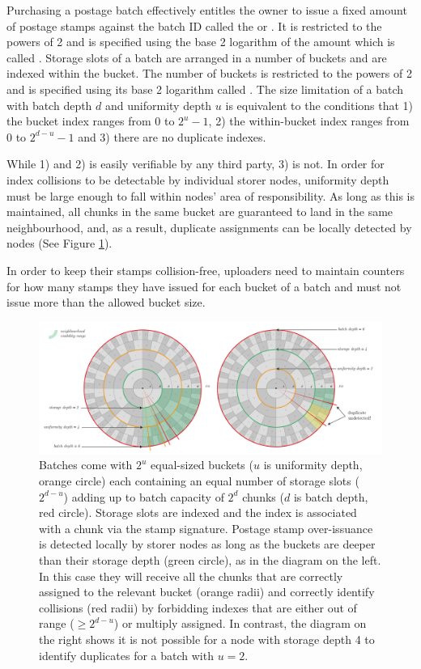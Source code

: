 Purchasing a postage batch effectively entitles the owner to issue a fixed amount of postage stamps against the batch ID called the  or . It is restricted to the powers of 2 and is specified using the base 2 logarithm of the amount which is called . Storage slots of a batch are arranged in a number of buckets and are indexed within the bucket. The number of buckets is restricted to the powers of 2 and is specified using its base 2 logarithm called . The size limitation of a batch with batch depth $d$ and uniformity depth $u$ is equivalent to the conditions that 1) the bucket index ranges from 0 to $2^u-1$, 2) the within-bucket index ranges  from 0 to $2^{d-u}-1$ and 3) there are no duplicate indexes.  

While 1) and 2) is easily verifiable by any third party, 3) is not.
In order for index collisions to be detectable by individual storer nodes, uniformity depth must be large enough to fall within nodes' area of responsibility.
As long as this is maintained, all chunks in the same bucket are guaranteed to land in the same neighbourhood, and, as a result, duplicate assignments can be locally detected by nodes (See Figure \ref{fig:over-issuance}).

In order to keep their stamps collision-free, uploaders need to maintain counters for how many stamps they have issued for each bucket of a batch and must not issue more than the allowed bucket size. 

\begin{figure}[!ht]
  \centering
    \includegraphics[width=1\textwidth]{fig/batch-structure.pdf}
  \caption[Batch structure, uniformity and over-issuance]{Batches come with $2^u$ equal-sized buckets ($u$ is uniformity depth, orange circle) each containing an equal number of storage slots ($2^{d-u}$) adding up to batch capacity of $2^d$ chunks ($d$ is batch depth, red circle). Storage slots are indexed and the index is associated with a chunk via the stamp signature. Postage stamp over-issuance is detected locally by storer nodes as long as the buckets are deeper than their storage depth (green circle), as in the diagram on the left. In this case they will receive all the chunks that are correctly assigned to the relevant bucket (orange radii) and correctly identify collisions (red radii) by forbidding indexes that are either out of range ($\geq 2^{d-u}$) or multiply assigned. In contrast, the diagram on the right shows it is not possible for a node with storage depth 4 to identify duplicates for a batch with $u=2$.}
\label{fig:over-issuance}
\end{figure}    



